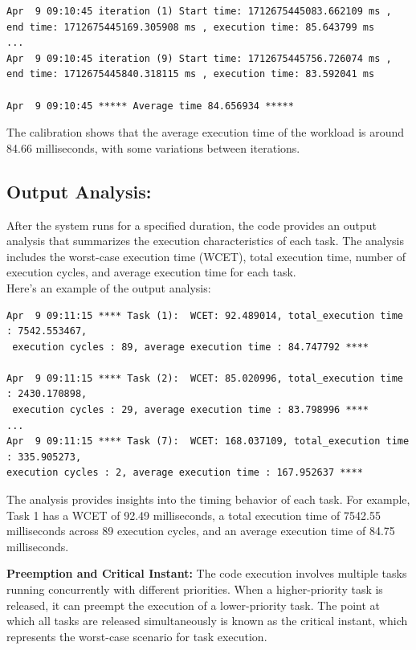 \documentclass[a4paper,11pt]{article}%
\newenvironment{qanda}{\setlength{\parindent}{0pt}}{\bigskip}
\begin{document}
\begin{qanda}
\begin{enumerate}
\begin{lstlisting}
Apr  9 09:10:45 iteration (1) Start time: 1712675445083.662109 ms , 
end time: 1712675445169.305908 ms , execution time: 85.643799 ms
...
Apr  9 09:10:45 iteration (9) Start time: 1712675445756.726074 ms , 
end time: 1712675445840.318115 ms , execution time: 83.592041 ms

Apr  9 09:10:45 ***** Average time 84.656934 *****
\end{lstlisting}

			The calibration shows that the average execution time of the workload is around 84.66 milliseconds, with some variations between iterations.


			\subsection{Output Analysis:}
			After the system runs for a specified duration, the code provides an output analysis that summarizes the execution characteristics of each task. The analysis includes the worst-case execution time (WCET), total execution time, number of execution cycles, and average execution time for each task.\\

			Here's an example of the output analysis:
			\begin{lstlisting}
Apr  9 09:11:15 **** Task (1):  WCET: 92.489014, total_execution time : 7542.553467,
 execution cycles : 89, average execution time : 84.747792 ****

Apr  9 09:11:15 **** Task (2):  WCET: 85.020996, total_execution time : 2430.170898,
 execution cycles : 29, average execution time : 83.798996 ****
...
Apr  9 09:11:15 **** Task (7):  WCET: 168.037109, total_execution time : 335.905273,
execution cycles : 2, average execution time : 167.952637 ****
\end{lstlisting}

			The analysis provides insights into the timing behavior of each task. For example, Task 1 has a WCET of 92.49 milliseconds, a total execution time of 7542.55 milliseconds across 89 execution cycles, and an average execution time of 84.75 milliseconds.

			\textbf{Preemption and Critical Instant:}
			The code execution involves multiple tasks running concurrently with different priorities. When a higher-priority task is released, it can preempt the execution of a lower-priority task. The point at which all tasks are released simultaneously is known as the critical instant, which represents the worst-case scenario for task execution.


\end{enumerate}
\end{qanda}
\end{document}
